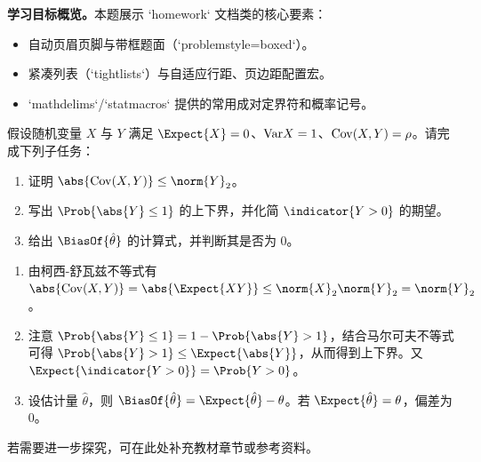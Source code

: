 \documentclass[lang=zh,problemstyle=boxed,theme=color,captionstyle=compact,subnumbering,tightlists,mathdelims,statmacros,localizedate]{homework}
\begin{document}
\maketitle

\pagebreak

\begin{problem}
    \textbf{学习目标概览。}本题展示 `homework` 文档类的核心要素：
    \begin{itemize}
        \item 自动页眉页脚与带框题面（`problemstyle=boxed`）。
        \item 紧凑列表（`tightlists`）与自适应行距、页边距配置宏。
        \item `mathdelims`/`statmacros` 提供的常用成对定界符和概率记号。
    \end{itemize}

    假设随机变量 $X$ 与 $Y$ 满足
    $\Expect{X}=0$、$\mathrm{Var}{X}=1$、$\mathrm{Cov}(X,Y)=\rho$。请完成下列子任务：
    \begin{enumerate}
        \item 证明 $\abs{\Cov(X,Y)} \leq \norm{Y}_2$。
        \item 写出 $\Prob{\abs{Y}\leq 1}$ 的上下界，并化简 $\indicator{Y>0}$ 的期望。
        \item 给出 $\BiasOf{\hat\theta}$ 的计算式，并判断其是否为 0。
    \end{enumerate}

    \solution

    \begin{enumerate}
        \item 由柯西-舒瓦兹不等式有
            $\abs{\Cov(X,Y)}=\abs{\Expect{XY}}\leq\norm{X}_2\norm{Y}_2=\norm{Y}_2$。
        \item 注意 $\Prob{\abs{Y}\leq 1}=1-\Prob{\abs{Y}>1}$，结合马尔可夫不等式可得
            $\Prob{\abs{Y}>1}\leq\Expect{\abs{Y}}$，从而得到上下界。又
            $\Expect{\indicator{Y>0}}=\Prob{Y>0}$。
        \item 设估计量 $\hat\theta$，则
            $\BiasOf{\hat\theta}=\Expect{\hat\theta}-\theta$。若 $\Expect{\hat\theta}=\theta$，偏差为 0。
    \end{enumerate}

    \begin{note}[延伸阅读]
        若需要进一步探究，可在此处补充教材章节或参考资料。
    \end{note}
\end{problem}

\pagebreak
\end{document}
